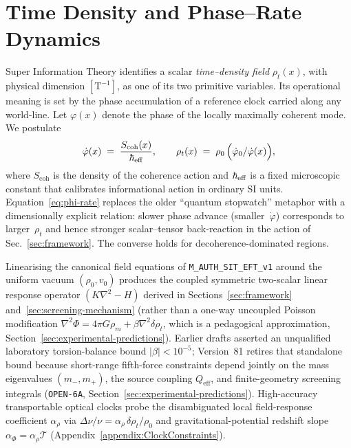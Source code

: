 \section{Time Density and Phase--Rate Dynamics}\label{sec:timedensity}

Super Information Theory identifies a scalar \emph{time--density field} $\rho_t(x)$, with physical dimension $[\mathrm{T}^{-1}]$, as one of its two primitive variables.  Its operational meaning is set by the phase accumulation of a reference clock carried along any world-line.  Let $\varphi(x)$ denote the phase of the locally maximally coherent mode.  We postulate
\begin{equation}\label{eq:phi-rate}
    \dot{\varphi}(x)\;=\;\frac{S_{\text{coh}}(x)}{\hbar_{\rm eff}},
    \qquad
    \rho_t(x)\;=\;\rho_0\,\Bigl(\dot{\varphi}_0/\dot{\varphi}(x)\Bigr),
\end{equation}
where $S_{\text{coh}}$ is the density of the coherence action and $\hbar_{\rm eff}$ is a fixed microscopic constant that calibrates informational action in ordinary SI units.  Equation~\eqref{eq:phi-rate} replaces the older ``quantum stopwatch'' metaphor with a dimensionally explicit relation: slower phase advance (smaller~$\dot{\varphi}$) corresponds to larger~$\rho_t$ and hence stronger scalar--tensor back-reaction in the action of Sec.~\ref{sec:framework}.  The converse holds for decoherence-dominated regions.

Linearising the canonical field equations of \texttt{M\_AUTH\_SIT\_EFT\_v1} around the uniform vacuum $(\rho_0, v_0)$ produces the coupled symmetric two-scalar linear response operator $(K\nabla^2 - H)$ derived in Sections~\ref{sec:framework} and~\ref{sec:screening-mechanism} (rather than a one-way uncoupled Poisson modification $\nabla^2\Phi = 4\pi G\rho_m + \beta\nabla^2\delta\rho_t$, which is a pedagogical approximation, Section~\ref{sec:experimental-predictions}). Earlier drafts asserted an unqualified laboratory torsion-balance bound $|\beta| < 10^{-5}$; Version~81 retires that standalone bound because short-range fifth-force constraints depend jointly on the mass eigenvalues $(m_-, m_+)$, the source coupling $Q_{\mathrm{eff}}$, and finite-geometry screening integrals (\texttt{OPEN-6A}, Section~\ref{sec:experimental-predictions}). High-accuracy transportable optical clocks probe the disambiguated local field-response coefficient $\alpha_\rho$ via $\Delta\nu/\nu = \alpha_\rho\,\delta\rho_t/\rho_0$ and gravitational-potential redshift slope $\alpha_\Phi = \alpha_\rho\mathcal{T}$ (Appendix~\ref{appendix:ClockConstraints}).

